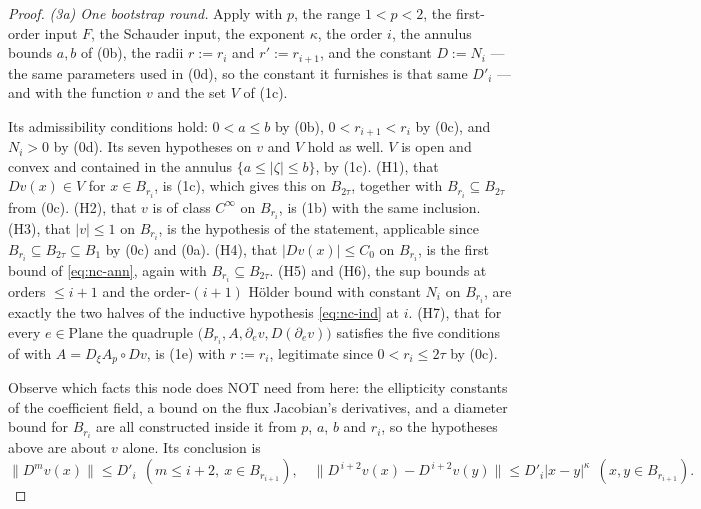 \begin{proof}
\emph{(3a) One bootstrap round.}  Apply  with $p$, the range
$1<p<2$, the first-order input $F$, the Schauder input, the exponent $\kappa$, the order $i$,
the annulus bounds $a,b$ of (0b), the radii $r:=r_i$ and $r':=r_{i+1}$, and the constant
$D:=N_i$ --- the same parameters used in (0d), so the constant it furnishes is that same
$D'_i$ --- and with the function $v$ and the set $V$ of (1c).

Its admissibility conditions hold: $0<a\le b$ by (0b), $0<r_{i+1}<r_i$ by (0c), and $N_i>0$ by
(0d).  Its seven hypotheses on $v$ and $V$ hold as well.  $V$ is open and convex and contained
in the annulus $\{a\le\lvert\zeta\rvert\le b\}$, by (1c).  (H1), that $Dv(x)\in V$ for
$x\in B_{r_i}$, is (1c), which gives this on $B_{2\tau}$, together with
$B_{r_i}\subseteq B_{2\tau}$ from (0c).  (H2), that $v$ is of class $C^{\infty}$ on $B_{r_i}$,
is (1b) with the same inclusion.  (H3), that $\lvert v\rvert\le1$ on $B_{r_i}$, is the
hypothesis of the statement, applicable since $B_{r_i}\subseteq B_{2\tau}\subseteq B_1$ by (0c)
and (0a).  (H4), that $\lvert Dv(x)\rvert\le C_0$ on $B_{r_i}$, is the first bound of
\eqref{eq:nc-ann}, again with $B_{r_i}\subseteq B_{2\tau}$.  (H5) and (H6), the sup bounds at
orders $\le i+1$ and the order-$(i+1)$ H\"older bound with constant $N_i$ on $B_{r_i}$, are
exactly the two halves of the inductive hypothesis \eqref{eq:nc-ind} at $i$.  (H7), that for
every $e\in\mathrm{Plane}$ the quadruple $\bigl(B_{r_i},A,\partial_ev,D(\partial_ev)\bigr)$
satisfies the five conditions of  with $A=D_\xi A_p\circ Dv$, is (1e)
with $r:=r_i$, legitimate since $0<r_i\le2\tau$ by (0c).

Observe which facts this node does NOT need from here: the ellipticity constants of the
coefficient field, a bound on the flux Jacobian's derivatives, and a diameter bound for
$B_{r_i}$ are all constructed inside it from $p$, $a$, $b$ and $r_i$, so the hypotheses above
are about $v$ alone.  Its conclusion is
\begin{equation}\label{eq:nc-round}
  \bigl\lVert D^{m}v(x)\bigr\rVert\le D'_i\ \ (m\le i+2,\ x\in B_{r_{i+1}}),
  \quad
  \bigl\lVert D^{\,i+2}v(x)-D^{\,i+2}v(y)\bigr\rVert\le D'_i\lvert x-y\rvert^{\kappa}
  \ \ (x,y\in B_{r_{i+1}}).
\end{equation}


\end{proof}
